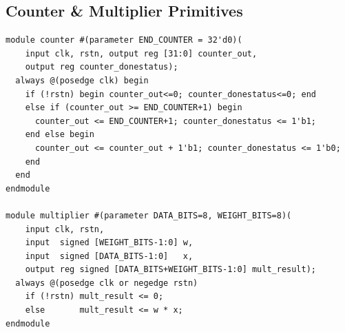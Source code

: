 \documentclass[10pt,a4paper]{article}
\begin{document}
\subsection{Counter \& Multiplier Primitives}
\begin{lstlisting}
module counter #(parameter END_COUNTER = 32'd0)(
    input clk, rstn, output reg [31:0] counter_out,
    output reg counter_donestatus);
  always @(posedge clk) begin
    if (!rstn) begin counter_out<=0; counter_donestatus<=0; end
    else if (counter_out >= END_COUNTER+1) begin
      counter_out <= END_COUNTER+1; counter_donestatus <= 1'b1;
    end else begin
      counter_out <= counter_out + 1'b1; counter_donestatus <= 1'b0;
    end
  end
endmodule

module multiplier #(parameter DATA_BITS=8, WEIGHT_BITS=8)(
    input clk, rstn,
    input  signed [WEIGHT_BITS-1:0] w,
    input  signed [DATA_BITS-1:0]   x,
    output reg signed [DATA_BITS+WEIGHT_BITS-1:0] mult_result);
  always @(posedge clk or negedge rstn)
    if (!rstn) mult_result <= 0;
    else       mult_result <= w * x;
endmodule
\end{lstlisting}
\end{document}
